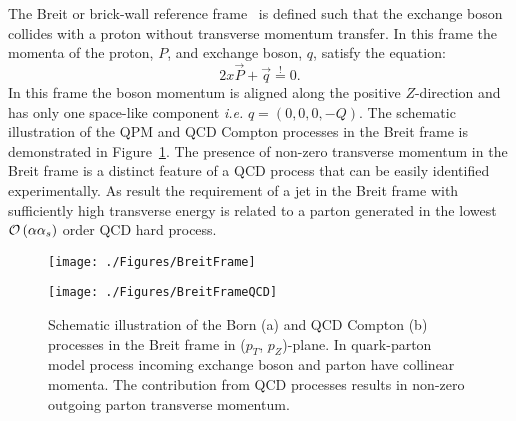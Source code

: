 The Breit or brick-wall reference frame~\cite{feynman:1972:photon,zfp:c2:237} is defined such that the exchange boson collides with a proton without transverse momentum transfer. In this frame the momenta of the proton, $P$, and exchange boson, $q$, satisfy the equation:
\begin{equation}
2x\vec{P} + \vec{q} \stackrel{!}{=} 0.
\label{eq:breitframe}
\end{equation}
In this frame the boson momentum is aligned along the positive $Z$-direction and has only one space-like component \textit{i.e.} $q=\left( 0, 0, 0, -Q\right)$. The schematic illustration of the QPM and QCD Compton processes in the Breit frame is demonstrated in Figure~\ref{fig:breitframe}. The presence of non-zero transverse momentum in the Breit frame is a distinct feature of a QCD process that can be easily identified experimentally. As result the requirement of a jet in the Breit frame with sufficiently high transverse energy is related to a parton generated in the lowest $\mathcal{O}\left(\alpha\mbox{$\alpha_{s}$}\right)$ order QCD hard process.
\begin{figure}
	\centering
	\begin{subfloat}[]{
		\texttt{[image: ./Figures/BreitFrame]}
		\label{fig:breitframeqpm}
	}%
	\end{subfloat}
	\begin{subfloat}[]{
		\texttt{[image: ./Figures/BreitFrameQCD]}
		\label{fig:breitframeqcd}
	}%
	\end{subfloat}
	\caption{Schematic illustration of the Born (a) and QCD Compton (b) processes in the Breit frame in ($p_T$, $p_Z$)-plane. In quark-parton model process incoming exchange boson and parton have collinear momenta. The contribution from QCD processes results in non-zero outgoing parton transverse momentum.}
\label{fig:breitframe}
\end{figure}